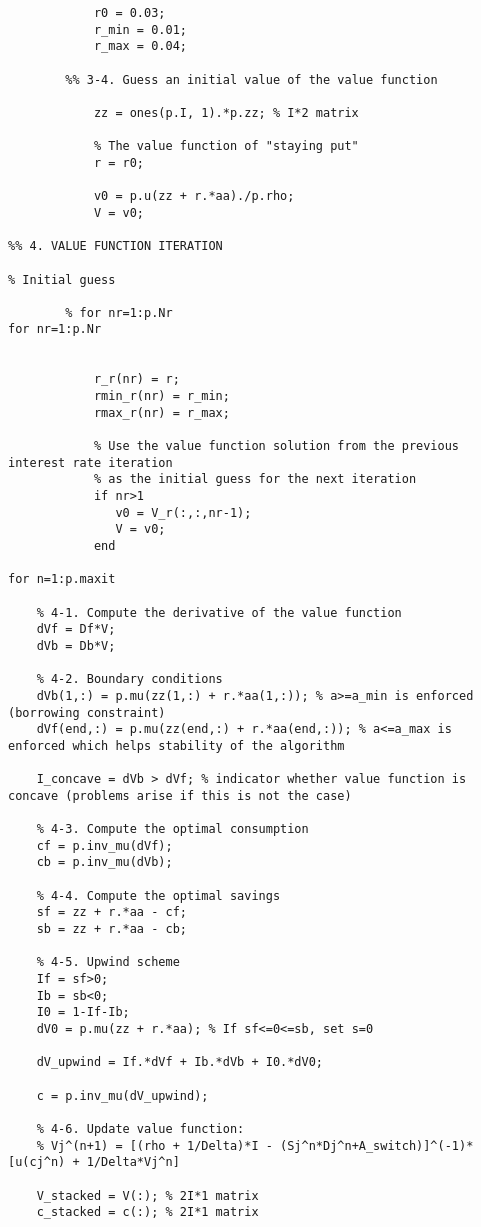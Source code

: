 \begin{lstlisting}
            r0 = 0.03;
            r_min = 0.01;
            r_max = 0.04;

        %% 3-4. Guess an initial value of the value function

            zz = ones(p.I, 1).*p.zz; % I*2 matrix
            
            % The value function of "staying put"
            r = r0;

            v0 = p.u(zz + r.*aa)./p.rho; 
            V = v0;

%% 4. VALUE FUNCTION ITERATION

% Initial guess

        % for nr=1:p.Nr
for nr=1:p.Nr

    
            r_r(nr) = r;
            rmin_r(nr) = r_min;
            rmax_r(nr) = r_max;
                               
            % Use the value function solution from the previous interest rate iteration 
            % as the initial guess for the next iteration
            if nr>1
               v0 = V_r(:,:,nr-1);
               V = v0;
            end

for n=1:p.maxit

    % 4-1. Compute the derivative of the value function 
    dVf = Df*V;
    dVb = Db*V;

    % 4-2. Boundary conditions
    dVb(1,:) = p.mu(zz(1,:) + r.*aa(1,:)); % a>=a_min is enforced (borrowing constraint)
    dVf(end,:) = p.mu(zz(end,:) + r.*aa(end,:)); % a<=a_max is enforced which helps stability of the algorithm

    I_concave = dVb > dVf; % indicator whether value function is concave (problems arise if this is not the case)

    % 4-3. Compute the optimal consumption
    cf = p.inv_mu(dVf);
    cb = p.inv_mu(dVb);
    
    % 4-4. Compute the optimal savings
    sf = zz + r.*aa - cf;
    sb = zz + r.*aa - cb;

    % 4-5. Upwind scheme
    If = sf>0;
    Ib = sb<0;
    I0 = 1-If-Ib;
    dV0 = p.mu(zz + r.*aa); % If sf<=0<=sb, set s=0

    dV_upwind = If.*dVf + Ib.*dVb + I0.*dV0;

    c = p.inv_mu(dV_upwind);

    % 4-6. Update value function: 
    % Vj^(n+1) = [(rho + 1/Delta)*I - (Sj^n*Dj^n+A_switch)]^(-1)*[u(cj^n) + 1/Delta*Vj^n]
    
    V_stacked = V(:); % 2I*1 matrix
    c_stacked = c(:); % 2I*1 matrix


\end{lstlisting}
